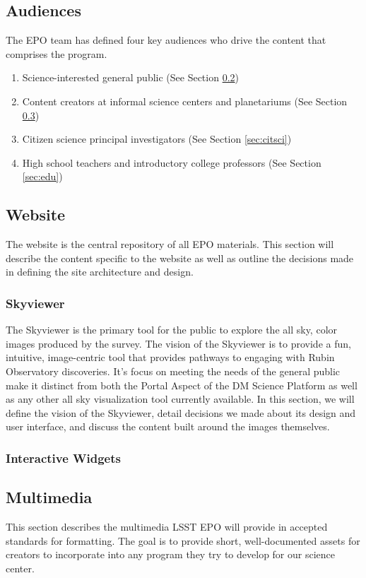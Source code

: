 \subsection{Audiences}\label{sec:audiences}
The EPO team has defined four key audiences who drive the content that comprises the program.  
\begin{enumerate}
    \item Science-interested general public (See Section \ref{sec:website})
    \item Content creators at informal science centers and planetariums (See Section \ref{sec:multimedia})  
    \item Citizen science principal investigators (See Section \ref{sec:citsci})
    \item High school teachers and introductory college professors (See Section \ref{sec:edu})
\end{enumerate}

\subsection{Website}\label{sec:website}
The website is the central repository of all EPO materials. This section will describe the content specific to the website as well as outline the decisions made in defining the site architecture and design. 

\subsubsection{Skyviewer}\label{sec:skyviewer}
The Skyviewer is the primary tool for the public to explore the all sky, color images produced by the survey. The vision of the Skyviewer is to provide a fun, intuitive, image-centric tool that provides pathways to engaging with Rubin Observatory discoveries. It's focus on meeting the needs of the general public make it distinct from both the Portal Aspect of the DM Science Platform as well as any other all sky visualization tool currently available.  In this section, we will define the vision of the Skyviewer, detail decisions we made about its design and user interface, and discuss the content built around the images themselves.

\subsubsection{Interactive Widgets}\label{sec:widget}


\subsection{Multimedia}\label{sec:multimedia}
This section describes the multimedia LSST EPO will provide in accepted standards for formatting. The goal is to provide short, well-documented assets for creators to incorporate into any program they try to develop for our science center. 



